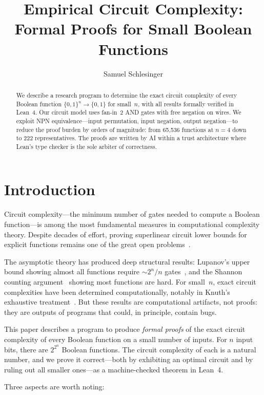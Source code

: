 \documentclass[11pt]{article}
\title{Empirical Circuit Complexity:\\
  Formal Proofs for Small Boolean Functions}
\author{Samuel Schlesinger}
\date{}
\newcommand{\Bool}{\{0,1\}}
\begin{document}
\maketitle

\begin{abstract}
We describe a research program to determine the exact circuit complexity of
every Boolean function $\Bool^n \to \Bool$ for small~$n$, with all results
formally verified in Lean~4. Our circuit model uses fan-in~2 AND gates with
free negation on wires. We exploit NPN equivalence---input permutation, input
negation, output negation---to reduce the proof burden by orders of magnitude:
from 65{,}536 functions at $n=4$ down to 222 representatives. The proofs are
written by AI within a trust architecture where Lean's type checker is the sole
arbiter of correctness.
\end{abstract}

\section{Introduction}

Circuit complexity---the minimum number of gates needed to compute a Boolean
function---is among the most fundamental measures in computational complexity
theory. Despite decades of effort, proving superlinear circuit lower bounds for
explicit functions remains one of the great open
problems~\cite{razborov, arora-barak}.

The asymptotic theory has produced deep structural results: Lupanov's upper
bound showing almost all functions require $\sim 2^n/n$
gates~\cite{lupanov}, and the Shannon counting argument~\cite{shannon} showing
most functions are hard. For small~$n$, exact circuit complexities have been
determined computationally, notably in Knuth's exhaustive
treatment~\cite{knuth-4a}. But these results are computational artifacts, not
proofs: they are outputs of programs that could, in principle, contain bugs.

This paper describes a program to produce \emph{formal proofs} of the exact
circuit complexity of every Boolean function on a small number of inputs. For
$n$ input bits, there are $2^{2^n}$ Boolean functions. The circuit complexity
of each is a natural number, and we prove it correct---both by exhibiting an
optimal circuit and by ruling out all smaller ones---as a machine-checked
theorem in Lean~4.

Three aspects are worth noting:
\end{document}
